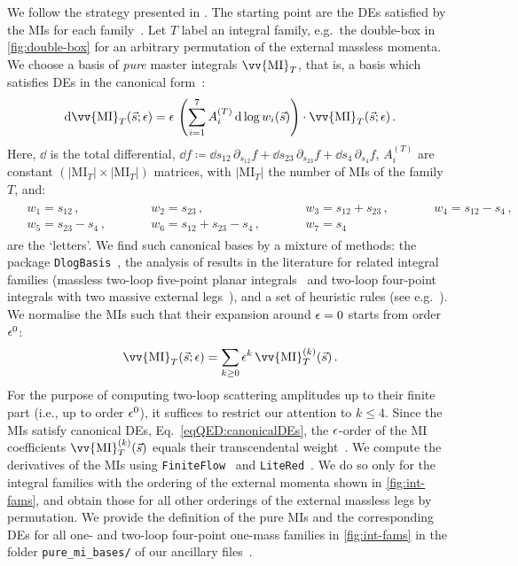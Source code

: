 \documentclass[main.tex]{subfiles}
\begin{document}
We follow the strategy presented in . The starting point are the DEs satisfied by the MIs for each family~\cite{Barucchi:1973zm, KOTIKOV1991158, KOTIKOV1991123, Gehrmann:1999as, Bern:1993kr}. Let $T$ label an integral family, e.g.\ the double-box in \cref{fig:double-box} for an arbitrary permutation of the external massless momenta. We choose a basis of \emph{pure} master integrals $\vv{\text{MI}}_T$, that is, a basis which satisfies DEs in the canonical form~\cite{Henn:2013pwa}:
\begin{align}
\label{eqQED:canonicalDEs}
\dd \vv{\text{MI}}_T(\vec{s}; \eps) = \eps \, \left( \sum_{i=1}^{7} A^{(T)}_i \, \dd \log w_i(\vec{s}) \right) \cdot \vv{\text{MI}}_T(\vec{s}; \eps) \,.
\end{align}
Here, $\dd$ is the total differential, $\dd f \coloneqq \dd s_{12} \, \partial_{s_{12}} f + \dd s_{23} \, \partial_{s_{23}} f +  \dd s_{4} \, \partial_{s_{4}} f $, $A^{(T)}_i$ are constant $\left(|\text{MI}_T| \times |\text{MI}_T|\right)$ matrices, with $|\text{MI}_T|$ the number of MIs of the family $T$, and: 
\begin{align}
\label{eqQED:alphabet}
\begin{alignedat}{4}
& w_1 = s_{12} \,, 
&& w_2 = s_{23} \,, 
&& w_3 = s_{12} + s_{23} \,, \qquad
&& w_4 = s_{12} - s_4 \,,  \\
& w_5 = s_{23} - s_4 \,, \qquad
&& w_6 = s_{12} + s_{23} - s_4 \,, \qquad
&& w_7 = s_4 \, &&
\end{alignedat}
\end{align}
are the `letters'. We find such canonical bases by a mixture of methods: the package \texttt{DlogBasis}~\cite{Henn:2020lye}, the analysis of results in the literature for related integral families (massless two-loop five-point planar integrals~\cite{Gehrmann:2015bfy} and two-loop four-point integrals with two massive external legs~\cite{Henn:2014lfa,Caola:2014lpa}), and a set of heuristic rules (see e.g.\ ).
We normalise the MIs such that their expansion around $\epsilon=0$ starts from order $\epsilon^0$:
\begin{align}
\vv{\text{MI}}_T(\vec{s} ; \eps) = \sum_{k \ge 0} \eps^k \, \vv{\text{MI}}_T^{(k)}(\vec{s}) \,.
\end{align}
For the purpose of computing two-loop scattering amplitudes up to their finite part (i.e., up to order $\epsilon^0$), it suffices to restrict our attention to $k \le 4$.
Since the MIs satisfy canonical DEs, Eq.~\ref{eqQED:canonicalDEs}, the $\epsilon$-order of the MI coefficients $\vv{\text{MI}}_T^{(k)}(\vec{s})$ equals their transcendental weight~\cite{Henn:2013pwa}.
We compute the derivatives of the MIs using \texttt{FiniteFlow}~\cite{Peraro:2019svx} and \texttt{LiteRed}~\cite{Lee:2012cn}.
We do so only for the integral families with the ordering of the external momenta shown in \cref{fig:int-fams}, and obtain those for all other orderings of the external massless legs by permutation. 
We provide the definition of the pure MIs and the corresponding DEs for all one- and two-loop four-point one-mass families in \cref{fig:int-fams} in the folder \texttt{pure\_mi\_bases/} of our ancillary files~\cite{zenodo}. 
\end{document}
